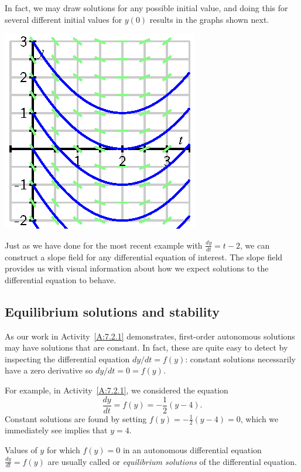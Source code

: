 In fact, we may draw solutions for any possible initial value, and doing this for several different initial values for $y(0)$ results in the graphs shown next.
    
\begin{center}
  \includegraphics{figures/7_2_field_4.eps}
\end{center}

Just as we have done for the most recent example with $\frac{dy}{dt} = t-2$, we can construct a slope field for any differential equation of interest.  The slope field provides us with visual information about how we expect solutions to the differential equation to behave.



\subsection*{Equilibrium solutions and stability} 

As our work in Activity~\ref{A:7.2.1} demonstrates, first-order autonomous
solutions may have solutions that are constant.  In fact, these are
quite easy to detect by inspecting the differential equation $dy/dt =
f(y)$:  constant solutions necessarily have a zero derivative so 
$dy/dt = 0 = f(y)$.  

For example, in Activity~\ref{A:7.2.1}, we considered the
equation
$$
\frac{dy}{dt} = f(y)=-\frac12(y-4).
$$
Constant solutions are found by setting $f(y) = -\frac12(y-4) = 0$,
which we immediately see implies that $y = 4$.  

Values of $y$ for which $f(y) = 0$ in an autonomous differential equation $\frac{dy}{dt} = f(y)$ are usually called or {\em equilibrium solutions}  of the differential
equation.  

